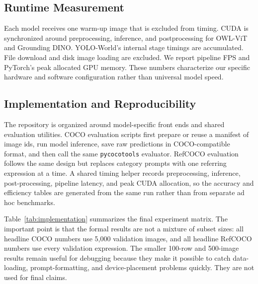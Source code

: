\documentclass[conference]{IEEEtran}
\begin{document}
\subsection{Runtime Measurement}

Each model receives one warm-up image that is excluded from timing. CUDA is
synchronized around preprocessing, inference, and postprocessing for OWL-ViT
and Grounding DINO. YOLO-World's internal stage timings are accumulated.
File download and disk image loading are excluded. We report pipeline FPS and
PyTorch's peak allocated GPU memory. These numbers characterize our specific
hardware and software configuration rather than universal model speed.

\subsection{Implementation and Reproducibility}

The repository is organized around model-specific front ends and shared
evaluation utilities. COCO evaluation scripts first prepare or reuse a manifest
of image ids, run model inference, save raw predictions in COCO-compatible
format, and then call the same \texttt{pycocotools} evaluator. RefCOCO
evaluation follows the same design but replaces category prompts with one
referring expression at a time. A shared timing helper records preprocessing,
inference, post-processing, pipeline latency, and peak CUDA allocation, so the
accuracy and efficiency tables are generated from the same run rather than from
separate ad hoc benchmarks.

Table~\ref{tab:implementation} summarizes the final experiment matrix. The
important point is that the formal results are not a mixture of subset sizes:
all headline COCO numbers use 5,000 validation images, and all headline
RefCOCO numbers use every validation expression. The smaller 100-row and
500-image results remain useful for debugging because they make it possible to
catch data-loading, prompt-formatting, and device-placement problems quickly.
They are not used for final claims.
\end{document}

